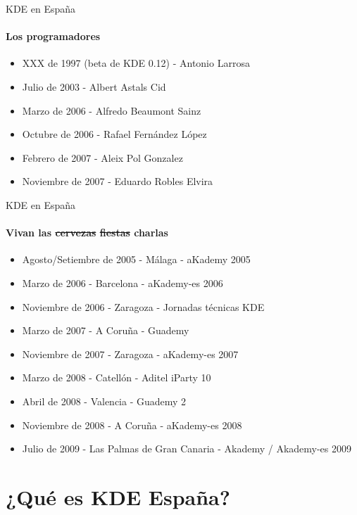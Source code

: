 \documentclass[12pt]{beamer}
\begin{document}
\begin{frame}{KDE en España}
	\framesubtitle{Los programadores}
	\begin{itemize}
		\item XXX de 1997 (beta de KDE 0.12) - Antonio Larrosa
 		\item Julio de 2003 - Albert Astals Cid
		\item Marzo de 2006 - Alfredo Beaumont Sainz
		\item Octubre de 2006 - Rafael Fernández López
		\item Febrero de 2007 - Aleix Pol Gonzalez
		\item Noviembre de 2007 - Eduardo Robles Elvira
	\end{itemize}
\end{frame}

\begin{frame}{KDE en España}
	\framesubtitle{Vivan las \sout{cervezas} \sout{fiestas} charlas}
	\begin{itemize}
		\item Agosto/Setiembre de 2005 - Málaga - aKademy 2005
		\item Marzo de 2006 - Barcelona - aKademy-es 2006
		\item Noviembre de 2006 - Zaragoza - Jornadas técnicas KDE
		\item Marzo de 2007 - A Coruña - Guademy
		\item Noviembre de 2007 - Zaragoza - aKademy-es 2007
		\item Marzo de 2008 - Catellón - Aditel iParty 10
		\item Abril de 2008 - Valencia - Guademy 2
		\item Noviembre de 2008 - A Coruña - aKademy-es 2008
        \item Julio de 2009 - Las Palmas de Gran Canaria - Akademy / Akademy-es 2009
	\end{itemize}
\end{frame}




\section{¿Qué es KDE España?}
\end{document}

